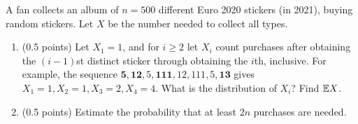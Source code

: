 \documentclass[a4paper]{report}
\newif\ifshowsolutions
\begin{document}
\begin{problem}
A fan collects an album of $n=500$ different Euro 2020 stickers (in 2021), buying random stickers. Let $X$ be the number needed to collect all types.
\begin{enumerate}
\item (0.5 points) Let $X_1=1$, and for $i\geq2$ let $X_i$ count purchases after obtaining the $(i-1)$st distinct sticker through obtaining the $i$th, inclusive. For example, the sequence $\mathbf5,\mathbf{12},5,\mathbf{111},12,111,5,\mathbf{13}$ gives $X_1=1,X_2=1,X_3=2,X_4=4$. What is the distribution of $X_i$? Find $\mathbb {E} X$.
\ifshowsolutions
\par\textbf{Solution.} $X_2\sim\mathrm{Ge}(499/500)$, since a new type appears with probability $499/500$; otherwise it is the initial type. Then $X_3\sim\mathrm{Ge}(498/500)$, and so on. Complete the argument.
\fi
\item (0.5 points) Estimate the probability that at least $2n$ purchases are needed.
\ifshowsolutions
\par\textbf{Solution.} Chebyshev's inequality. This is the well-known \href{https://en.wikipedia.org/wiki/Coupon_collector\%27s_problem}{coupon collector's problem}, also appearing in bonus homework 2. Problems 4 and 5 are in fact very similar.
\fi
\end{enumerate}
\end{problem}
\end{document}
